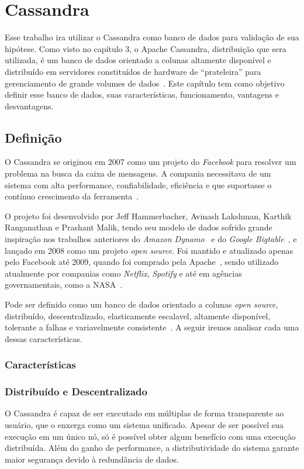 \chapter{Cassandra}

Esse trabalho ira utilizar o Cassandra como banco de dados para validação de sua hipótese. Como visto no capítulo 3, o Apache Cassandra, distribuição que sera utilizada, é um banco de dados orientado a colunas altamente disponível e distribuído em servidores constituídos de hardware de \enquote{prateleira} para gerenciamento de grande volumes de dados~\cite{lakshmancassandra}. Este capítulo tem como objetivo definir esse banco de dados, suas características, funcionamento, vantagens e desvantagens.

\section{Definição}
O Cassandra se originou em 2007 como um projeto do \emph{Facebook} para resolver um problema na busca da caixa de mensagens. A compania necessitava de um sistema com alta performance, confiabilidade, eficiência e que suportasse o contínuo crescimento da ferramenta~\cite{lakshmancassandra, cassandraguide}. 

O projeto foi desenvolvido por Jeff Hammerbacher, Avinash Lakshman, Karthik Ranganathan e Prashant Malik, tendo seu modelo de dados sofrido grande inspiração nos trabalhos anteriores do \emph{Amazon Dynamo}~\cite{dynamo} e do \emph{Google Bigtable}~\cite{bigtable}, e lançado em 2008 como um projeto \emph{open source}. Foi mantido e atualizado apenas pelo Facebook até 2009, quando foi comprado pela Apache~\cite{cassandraguide}, sendo utilizado atualmente por companias como \emph{Netflix}, \emph{Spotify} e até em agências governamentais, como a NASA~\cite{cassandracompanies}. 

Pode ser definido como um banco de dados orientado a colunas \emph{open source}, distribuído, descentralizado, elasticamente escalavel, altamente disponível, tolerante a falhas e variavelmente consistente~\cite{cassandraguide}. A seguir iremos analisar cada uma dessas características.

\subsection{Características}

\subsection*{Distribuído e Descentralizado}
O Cassandra é capaz de ser executado em múltiplas de forma transparente ao usuário, que o enxerga como um sistema unificado. Apesar de ser possível sua execução em um único nó, só é possível obter algum benefício com uma execução distribuída. Além do ganho de performance, a distributividade do sistema garante maior segurança devido à redundância de dados.

